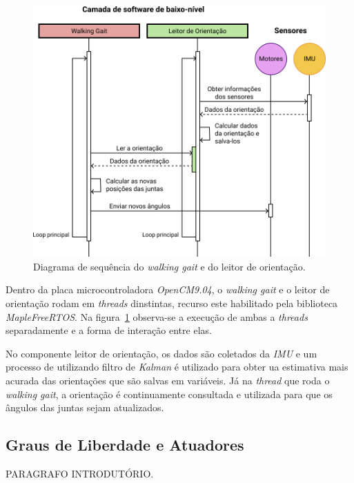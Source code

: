 \begin{figure}[htb]
	\centering
	\includegraphics[scale=0.8]{imagens/svg/softwarearchitecture-lowlevel}
	\caption{Diagrama de sequência do \textit{walking gait} e do leitor de orientação.}
	\label{fig:softwarearchitecture:lowlevel}
\end{figure}

Dentro da placa microcontroladora \textit{OpenCM9.04}, o \textit{walking gait} e o leitor de orientação rodam em \textit{threads} dinstintas, recurso este habilitado pela biblioteca \textit{MapleFreeRTOS}. Na figura~\ref{fig:softwarearchitecture:lowlevel} observa-se a execução de ambas a \textit{threads} separadamente e a forma de interação entre elas.	

No componente leitor de orientação, os dados são coletados da \textit{IMU} e um processo de utilizando filtro de \textit{Kalman} é utilizado para obter ua estimativa mais acurada das orientações que são salvas em variáveis. Já na \textit{thread} que roda o \textit{walking gait}, a orientação é continuamente consultada e utilizada para que os ângulos das juntas sejam atualizados.

\subsection{Graus de Liberdade e Atuadores}
\label{subsec:architecture:Atuators}

PARAGRAFO INTRODUTÓRIO.

